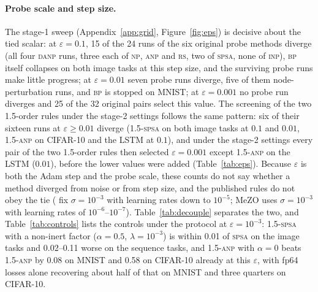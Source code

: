 \documentclass{article}
\newcommand{\method}[1]{\textsc{#1}}
\newcommand{\BP}{\method{bp}}
\newcommand{\SPSA}{\method{spsa}}
\newcommand{\SPSAb}{\method{1.5-spsa}}
\newcommand{\RS}{\method{rs}}
\newcommand{\NP}{\method{np}}
\newcommand{\ANP}{\method{anp}}
\newcommand{\ANPb}{\method{1.5-anp}}
\newcommand{\INP}{\method{inp}}
\newcommand{\DANP}{\method{danp}}
\begin{document}
\paragraph{Probe scale and step size.}
The stage-1 sweep (Appendix~\ref{app:grid}, Figure~\ref{fig:eps}) is decisive about the
tied scalar: at $\varepsilon=0.1$, 15 of the 24 runs of the six original probe methods
diverge (all four \DANP{} runs, three each of \NP{}, \ANP{} and \RS{}, two of
\SPSA{}, none of \INP{}), \BP{} itself collapses on both image tasks at this step size,
and the surviving probe runs make little progress; at $\varepsilon=0.01$ seven probe
runs diverge, five of them node-perturbation runs, and \BP{} is stopped on MNIST; at
$\varepsilon=0.001$ no probe run diverges and 25 of the 32 original pairs select this
value. The screening of the two 1.5-order rules under the stage-2 settings follows the
same pattern: six of their sixteen runs at $\varepsilon\ge 0.01$ diverge (\SPSAb{} on
both image tasks at $0.1$ and $0.01$, \ANPb{} on CIFAR-10 and the LSTM at $0.1$), and
under the stage-2 settings every pair of the two 1.5-order rules then selected $\varepsilon=0.001$
except \ANPb{} on the LSTM ($0.01$), before the lower values were added
(Table~\ref{tab:eps}). Because $\varepsilon$ is both the Adam step
and the probe scale, these counts do not say whether a method diverged from noise or
from step size, and the published rules do not obey the tie (\citet{dalm2023} fix
$\sigma=10^{-3}$ with learning rates down to $10^{-5}$; MeZO uses
$\sigma=10^{-3}$ with learning rates of $10^{-6}$--$10^{-7}$). Table~\ref{tab:decouple}
separates the two, and Table~\ref{tab:controls} lists the controls under the protocol
at $\varepsilon=10^{-3}$: \SPSAb{} with a non-inert factor ($\alpha=0.5$,
$\lambda=10^{-3}$) is within 0.01 of \SPSA{} on the image tasks and 0.02--0.11 worse on
the sequence tasks, and \ANPb{} with $\alpha=0$ beats \ANPb{} by 0.08 on MNIST and
0.58 on CIFAR-10 already at this $\varepsilon$, with fp64 losses alone recovering
about half of that on MNIST and three quarters on CIFAR-10.

\begin{table}[t]
  \caption{Probe scale decoupled from the step size: test loss of the best validation
  checkpoint within 30 minutes for every probe method and task. Off-diagonal cells are
  single 30-minute runs; the tied diagonal cells are one-hour runs at minute 30 (the stage-2 seeds where
  that value was selected, the stage-1 run otherwise). The
  $\eta=10^{-3}$ off-diagonal cells and the ($\eta=10^{-2}$, $\sigma=10^{-3}$) cell were
  run only for the rules that show them; the last column is the $\sigma=0.1$ row
  added at $\eta=10^{-4}$. A dagger marks a diverged run.}
  \label{tab:decouple}
  \centering
  \scriptsize
  \setlength{\tabcolsep}{3pt}
  
\end{table}
\end{document}

